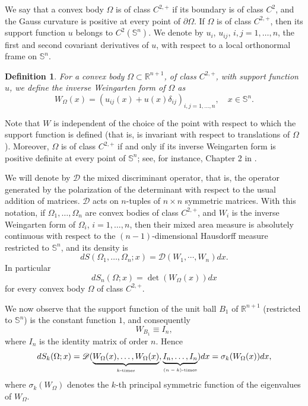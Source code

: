 \documentclass[12pt]{amsart}
\newtheorem{definition}[theorem]{Definition}
\newcommand{\R}{\mathbb R}
\newcommand{\1}{\mathbf 1}
\newcommand{\sfe}{{{\mathbb S}^{n}}}
\begin{document}
We say that a convex body $\Omega$ is of class $C^{2,+}$ if its boundary is of class $C^2$, and the Gauss curvature is positive at every point of $\partial\Omega$. If $\Omega$ is of class $C^{2,+}$, then its support function $u$ belongs to $C^2(\sfe)$. We denote by $u_i$, $u_{ij}$, $i,j=1,\dots,n$, the first and second covariant derivatives of $u$, with respect to a local orthonormal frame on $\sfe$. 

\begin{definition}\label{W} For a convex body $\Omega\subset \mathbb R^{n+1}$, of class $C^{2,+}$, with support function $u$, we define the inverse Weingarten form of $\Omega$ as
\begin{equation}\label{w-def} 
W_\Omega(x)=(u_{ij}(x)+u(x)\delta_{ij})_{i,j=1,\dots,n},\quad x\in\sfe.
\end{equation} 
\end{definition}

Note that $W$ is independent of the choice of the point with respect to which the support function is defined (that is, is invariant with respect to translations of $\Omega$). Moreover, $\Omega$ is of class $C^{2,+}$ if and only if its inverse Weingarten form is positive definite at every point of $\sfe$; see, for instance, Chapter 2 in \cite{Schneider}.

\medskip

We will denote by $\mathscr{D}$ the mixed discriminant operator, that is, the operator generated by the polarization of the determinant with respect to the usual addition of matrices. 
$\mathscr{D}$ acts on $n$-tuples of $n\times n$ symmetric matrices. With this notation, if $\Omega_1,\dots,\Omega_n$ are convex bodies of class $C^{2,+}$, and $W_i$ is the inverse Weingarten form of $\Omega_i$, $i=1,\dots,n$, then their mixed area measure is absolutely continuous with respect to the $(n-1)$-dimensional Hausdorff measure restricted to $\sfe$, and its density is
\begin{equation}\label{density of mixed area measures}
dS(\Omega_1,\dots,\Omega_n;x)=\mathscr{D}(W_1,\cdots, W_n)dx.
\end{equation}
In particular
$$
dS_n(\Omega;x)=\det(W_\Omega(x))dx
$$
for every convex body $\Omega$ of class $C^{2,+}$. 

We now observe that the support function of the unit ball $B_1$ of $\R^{n+1}$ (restricted to $\sfe$) is the constant function $1$, and consequently 
$$
W_{B_1}\equiv I_n,
$$
where $I_n$ is the identity matrix of order $n$. Hence 
$$
dS_k(\Omega;x)=\mathscr{D}(\underbrace{W_\Omega(x),\dots, W_\Omega(x)}_{\mbox{\tiny $k$-times}},\underbrace{I_n,\dots,I_n}_{\mbox{\tiny $(n-k)$-times}})dx=\sigma_k(W_\Omega(x))dx,
$$
where $\sigma_k(W_\Omega)$ denotes the $k$-th principal symmetric function of the eigenvalues of $W_\Omega$.
\end{document}
